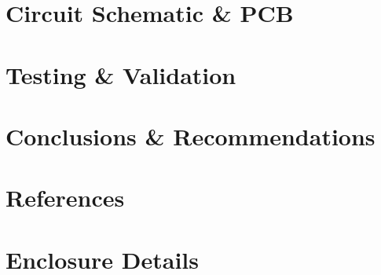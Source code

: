 \documentclass{article}
\begin{document}
\section{Circuit Schematic \& PCB}
\paragraph{}

\section{Testing \& Validation}
\paragraph{}

\section{Conclusions \& Recommendations}
\paragraph{}

\section*{References}

\nocite{*}



\appendix
\section{Enclosure Details}
\end{document}
